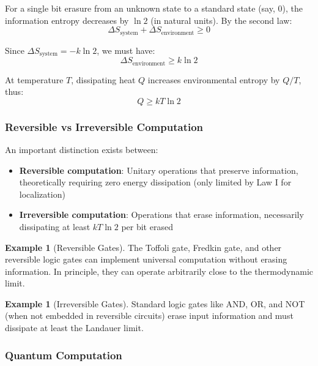 \documentclass[11pt,a4paper]{article}
\theoremstyle{plain}
\theoremstyle{definition}
\newtheorem{example}[theorem]{Example}
\theoremstyle{remark}
\begin{document}
For a single bit erasure from an unknown state to a standard state (say, $0$), the information entropy decreases by $\ln 2$ (in natural units). By the second law:
\begin{equation}
\Delta S_{\text{system}} + \Delta S_{\text{environment}} \geq 0
\end{equation}

Since $\Delta S_{\text{system}} = -k\ln 2$, we must have:
\begin{equation}
\Delta S_{\text{environment}} \geq k\ln 2
\end{equation}

At temperature $T$, dissipating heat $Q$ increases environmental entropy by $Q/T$, thus:
\begin{equation}
Q \geq kT\ln 2
\end{equation}

\subsubsection{Reversible vs Irreversible Computation}

An important distinction exists between:

\begin{itemize}[leftmargin=*]
\item \textbf{Reversible computation}: Unitary operations that preserve information, theoretically requiring zero energy dissipation (only limited by Law I for localization)
\item \textbf{Irreversible computation}: Operations that erase information, necessarily dissipating at least $kT\ln 2$ per bit erased
\end{itemize}

\begin{example}[Reversible Gates]
The Toffoli gate, Fredkin gate, and other reversible logic gates can implement universal computation without erasing information. In principle, they can operate arbitrarily close to the thermodynamic limit.
\end{example}

\begin{example}[Irreversible Gates]
Standard logic gates like AND, OR, and NOT (when not embedded in reversible circuits) erase input information and must dissipate at least the Landauer limit.
\end{example}

\subsubsection{Quantum Computation}
\end{document}
